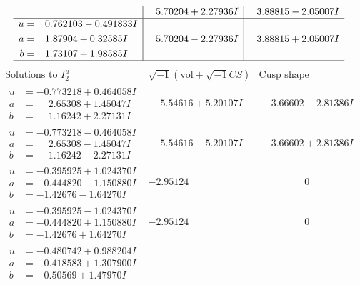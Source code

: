 \documentclass[1p]{elsarticle_modified}
\theoremstyle{definition}
\newcommand{\I}{\sqrt{-1}}
\begin{document}
$$\begin{array}{c|c|c}
 & \phantom{-}5.70204 + 2.27936 I & \phantom{-}3.88815 - 2.05007 I \\ \hline\begin{aligned}
u &= \phantom{-}0.762103 - 0.491833 I \\
a &= \phantom{-}1.87904 + 0.32585 I \\
b &= \phantom{-}1.73107 + 1.98585 I\end{aligned}
 & \phantom{-}5.70204 - 2.27936 I & \phantom{-}3.88815 + 2.05007 I\\
 \hline 
 \end{array}$$\newpage$$\begin{array}{c|c|c}  
\text{Solutions to }I^u_{2}& \I (\text{vol} + \sqrt{-1}CS) & \text{Cusp shape}\\
 \hline 
\begin{aligned}
u &= -0.773218 + 0.464058 I \\
a &= \phantom{-}2.65308 + 1.45047 I \\
b &= \phantom{-}1.16242 + 2.27131 I\end{aligned}
 & \phantom{-}5.54616 + 5.20107 I & \phantom{-}3.66602 - 2.81386 I \\ \hline\begin{aligned}
u &= -0.773218 - 0.464058 I \\
a &= \phantom{-}2.65308 - 1.45047 I \\
b &= \phantom{-}1.16242 - 2.27131 I\end{aligned}
 & \phantom{-}5.54616 - 5.20107 I & \phantom{-}3.66602 + 2.81386 I \\ \hline\begin{aligned}
u &= -0.395925 + 1.024370 I \\
a &= -0.444820 - 1.150880 I \\
b &= -1.42676 - 1.64270 I\end{aligned}
 & -2.95124\phantom{ +0.000000I} & \phantom{-0.000000 } 0 \\ \hline\begin{aligned}
u &= -0.395925 - 1.024370 I \\
a &= -0.444820 + 1.150880 I \\
b &= -1.42676 + 1.64270 I\end{aligned}
 & -2.95124\phantom{ +0.000000I} & \phantom{-0.000000 } 0 \\ \hline\begin{aligned}
u &= -0.480742 + 0.988204 I \\
a &= -0.418583 + 1.307900 I \\
b &= -0.50569 + 1.47970 I\end{aligned}

\end{array}$$
\end{document}
